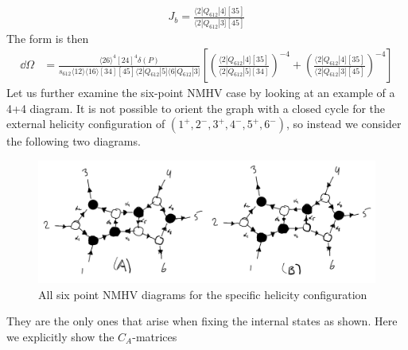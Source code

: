 \documentclass[letter,11pt]{article}
\newcommand{\ab}[1]{\langle #1 \rangle}
\newcommand{\sqb}[1]{[ #1 ]}
\newcommand{\aMs}[3]{\langle #1|#2|#3]}  		%
\begin{document}
\begin{equation}
	\begin{aligned}
		J_b=\frac{\aMs{2}{Q_{612}}{4}\sqb{35}}{\aMs{2}{Q_{612}}{3}\sqb{45}}
	\end{aligned}
\end{equation}
The form is then
\begin{equation}
	\begin{aligned}
		\dd\Omega&=\frac{\ab{26}^4\sqb{24}^4\delta(P)}{s_{612}\ab{12}\ab{16}\sqb{34}\sqb{45}\aMs{2}{Q_{612}}{5}\aMs{6}{Q_{612}}{3}}\left[\left(\frac{\aMs{2}{Q_{612}}{4}\sqb{35}}{\aMs{2}{Q_{612}}{5}\sqb{34}}\right)^{-4}+\left(\frac{\aMs{2}{Q_{612}}{4}\sqb{35}}{\aMs{2}{Q_{612}}{3}\sqb{45}}\right)^{-4}\right]
	\end{aligned}
\end{equation}
Let us further examine the six-point NMHV case by looking at an example of a 4+4 diagram. It is not possible to orient the graph with a closed cycle for the external helicity configuration of $(1^+,2^-,3^+,4^-,5^+,6^-)$, so instead we consider the following two diagrams.
\begin{figure}[H]
	\centering
	\includegraphics[width=0.9\linewidth]{6pt}
	\caption{All six point NMHV diagrams for the specific helicity configuration}
	\label{fig:two-loop}
\end{figure}
\noindent They are the only ones that arise when fixing the internal states as shown. Here we explicitly show the $C_A$-matrices
\end{document}
